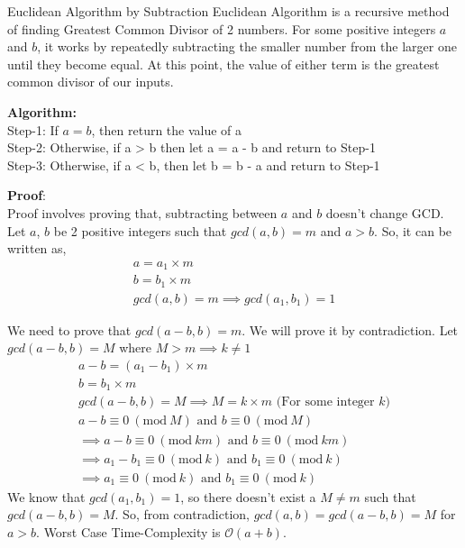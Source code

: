 \documentclass[8pt]{beamer}
\begin{document}
\begin{frame}[allowframebreaks]{Euclidean Algorithm by Subtraction}
Euclidean Algorithm is a recursive method of finding Greatest Common Divisor of 2 numbers. For some positive integers $a$ and $b$, it works by repeatedly subtracting the smaller number from the larger one until they become equal. At this point, the value of either term is the greatest common divisor of our inputs.

\textbf{Algorithm:}\\
Step-1: If $a = b$, then return the value of a\\
Step-2: Otherwise, if a > b then let a = a - b and return to Step-1\\
Step-3: Otherwise, if a < b, then let b = b - a and return to Step-1\\

\vspace{0.2in}

\textbf{Proof}:\\
Proof involves proving that, subtracting between $a$ and $b$ doesn't change GCD. Let $a$, $b$ be 2 positive integers such that $gcd(a,b) = m$ and $a > b$. So, it can be written as,
\begin{align}
    a = a_{1} \times m \\
    b = b_{1} \times m \\
    gcd(a,b) = m \implies gcd(a_{1}, b_{1}) = 1
\end{align}

\framebreak
We need to prove that $gcd(a-b,b) = m$. We will prove it by contradiction. Let $gcd(a-b,b) = M$ where $M > m \implies  k \neq 1$
\begin{align}
    a-b = (a_{1} - b_{1}) \times m\\
    b =  b_{1} \times m\\
    gcd(a-b,b) = M \implies M = k \times m \text{ (For some integer $k$)}\\
    a-b \equiv 0\ (\textrm{mod}\ M) \text{ and } b \equiv 0\ (\textrm{mod}\ M)\\
    \implies a-b \equiv 0\ (\textrm{mod}\ km) \text{ and } b \equiv 0\ (\textrm{mod}\ km)\\
    \implies a_{1} - b_{1} \equiv 0\ (\textrm{mod}\ k) \text{ and } b_{1} \equiv 0\ (\textrm{mod}\ k)\\
    \implies a_{1} \equiv 0\ (\textrm{mod}\ k) \text{ and } b_{1} \equiv 0\ (\textrm{mod}\ k)
\end{align}
We know that $gcd(a_{1}, b_{1}) = 1$, so there doesn't exist a $M \neq m$ such that $gcd(a-b, b) = M$. So, from contradiction, $gcd(a, b) = gcd(a-b, b) = M$ for $a > b$. Worst Case Time-Complexity is $\mathcal{O}(a+b)$.


\end{frame}
\end{document}
